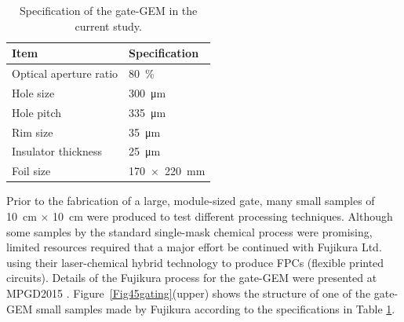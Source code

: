 \begin{table}[]
\begin{center}
\begin{tabular}{|l|l|}
\hline
Item & Specification \\%
\hline
\hline
Optical aperture ratio &  \SI{80}{\percent} \\
Hole size       & \SI{300}{\micro\meter}\\
Hole pitch       & \SI{335}{\micro\meter}\\
Rim size            & \SI{35}{\micro\meter}  \\
Insulator thickness  & \SI{25}{\micro\meter}\\
Foil size            & \SI{170x220}{\milli\meter} \\
\hline
\end{tabular}
\caption{\label{gatespecs} Specification of the gate-GEM in the current study.}
\end{center}
\end{table}

%

Prior to the fabrication of a large, module-sized gate, many small samples of
\SI{10}{\centi\meter} $\times$ \SI{10}{\centi\meter} were produced to test different processing techniques.
Although some samples by the standard single-mask chemical process were promising, limited resources required that
a major effort be continued with Fujikura Ltd.~\cite{ref5fujikuraltd} using their laser-chemical hybrid technology to produce
FPCs (flexible printed circuits). Details of the Fujikura process for the gate-GEM were presented at MPGD2015 \cite{MPGD2015_gate}.
Figure~\ref{Fig45gating}(upper) shows the structure of one of the gate-GEM small samples made by Fujikura
according to the specifications in Table \ref{gatespecs}.




